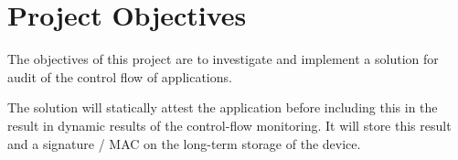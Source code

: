\section{Project Objectives}

The objectives of this project are to investigate and implement a solution for audit of the control flow of applications.

The solution will statically attest the application before including this in the result in dynamic results of the control-flow monitoring. It will store this result and a signature / MAC on the long-term storage of the device.